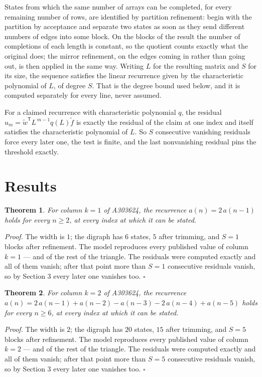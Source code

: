 \documentclass[11pt]{article}
\newtheorem{theorem}{Theorem}
\theoremstyle{definition}
\begin{document}
States from which the same number of arrays can be completed, for every remaining number of rows, are identified by partition refinement: begin with the partition by acceptance and separate two states as soon as they send different numbers of edges into some block. On the blocks of the result the number of completions of each length is constant, so the quotient counts exactly what the original does; the mirror refinement, on the edges coming in rather than going out, is then applied in the same way. Writing $L$ for the resulting matrix and $S$ for its size, the sequence satisfies the linear recurrence given by the characteristic polynomial of $L$, of degree $S$. That is the degree bound used below, and it is computed separately for every line, never assumed.

For a claimed recurrence with characteristic polynomial $q$, the residual $u_m = \tilde w^{\mathsf T}L^{\,m-1}q(L)\tilde f$ is exactly the residual of the claim at one index and itself satisfies the characteristic polynomial of $L$. So $S$ consecutive vanishing residuals force every later one, the test is finite, and the last nonvanishing residual pins the threshold exactly.

\section{Results}

\begin{theorem} For column $k = 1$ of A303624, the recurrence $a(n) = 2\,a(n-1)$ holds for every $n \ge 2$, at every index at which it can be stated.\end{theorem}

{\itshape Proof.} The width is $1$; the digraph has $6$ states, $5$ after trimming, and $S = 1$ blocks after refinement. The model reproduces every published value of column $k = 1$ --- and of the rest of the triangle. The residuals were computed exactly and all of them vanish; after that point more than $S = 1$ consecutive residuals vanish, so by Section 3 every later one vanishes too. $\square$

\begin{theorem} For column $k = 2$ of A303624, the recurrence $a(n) = 2\,a(n-1) + a(n-2) - a(n-3) - 2\,a(n-4) + a(n-5)$ holds for every $n \ge 6$, at every index at which it can be stated.\end{theorem}

{\itshape Proof.} The width is $2$; the digraph has $20$ states, $15$ after trimming, and $S = 5$ blocks after refinement. The model reproduces every published value of column $k = 2$ --- and of the rest of the triangle. The residuals were computed exactly and all of them vanish; after that point more than $S = 5$ consecutive residuals vanish, so by Section 3 every later one vanishes too. $\square$
\end{document}

